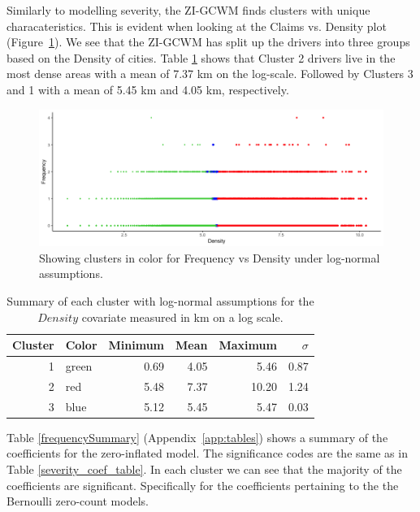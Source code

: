 \documentclass[11pt,letterpaper]{article}
\numberwithin{equation}{section}
\numberwithin{equation}{section}
\numberwithin{equation}{section}
\begin{document}
Similarly to modelling severity, the ZI-GCWM finds clusters with unique characateristics. This is evident when looking at the Claims vs. Density plot (Figure~\ref{frequencyGraph}). We see that the ZI-GCWM has split up the drivers into three groups based on the Density of cities. Table \ref{summarycovariates} shows that Cluster 2 drivers live in the most dense areas with a mean of 7.37 km on the log-scale. Followed by Clusters 3 and 1 with a mean of 5.45 km and 4.05 km, respectively.
\begin{figure}[!ht]
\begin{center}
\includegraphics[scale=0.47]{freqPlot.png}
\end{center}
\vspace{-0.2in}\caption{Showing clusters in color for Frequency vs Density under log-normal assumptions.}
\label{frequencyGraph}
\end{figure}
\begin{table}[!htb]
 \begin{center}
 \caption{Summary of each cluster with log-normal assumptions for the $Density$ covariate measured in km on a log scale.} \label{summarycovariates}
\begin{tabular}{rlrrrr}
\hline
Cluster  & Color & Minimum & Mean & Maximum & $\sigma$  \\
\hline
1       & green  & 0.69 & 4.05 & 5.46  & 0.87 \\
2       & red    & 5.48 & 7.37 & 10.20 & 1.24 \\
3       & blue   & 5.12 & 5.45 & 5.47  & 0.03 \\
\hline
\end{tabular}
\end{center}
\end{table}

Table \ref{frequencySummary} (Appendix~\ref{app:tables}) shows a summary of the coefficients for the zero-inflated model. The
significance codes are the same as in Table \ref{severity_coef_table}. In each cluster we can see that the majority of the coefficients are significant. Specifically for the coefficients pertaining to the the Bernoulli zero-count models. 
\end{document}
